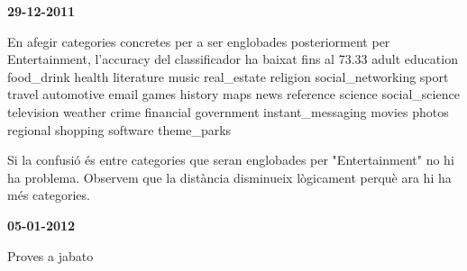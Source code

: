 \textbf{29-12-2011}

  En afegir categories concretes per a ser englobades posteriorment per Entertainment, l'accuracy del classificador ha baixat fins al 73.33
  adult       education  food\_drink  health             literature  music   real\_estate  religion  social\_networking  sport        travel
  automotive  email      games       history            maps        news    reference    science   social\_science     television   weather
  crime       financial  government  instant\_messaging  movies      photos  regional     shopping  software           theme\_parks

  Si la confusió és entre categories que seran englobades per "Entertainment" no hi ha problema. 
  Observem que la distància disminueix lògicament perquè ara hi ha més categories.

\textbf{05-01-2012}
 
  Proves a jabato
